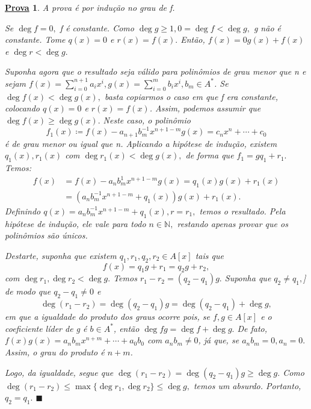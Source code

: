 \documentclass{article}
\newtheorem*{proof*}{\underline{Prova}}
\renewcommand\qedsymbol{$\blacksquare$}
\begin{document}
    \begin{proof*}
      A prova é por indução no grau de f.

      Se \(\deg{f}=0,\) f é constante. Como \(\deg{g}\geq 1, 0 = \deg{f} < \deg{g},\) g não é constante.
      Tome \(q(x) = 0\) e \(r(x) = f(x).\) Então, \(f(x) = 0g(x) + f(x)\) e \(\deg{r} < \deg{g}.\)

      Suponha agora que o resultado seja válido para polinômios de grau menor que n e sejam \(f(x) = \sum\limits_{i=0}^{n+1}a_{i}x^{i}, g(x) = \sum\limits_{i=0}^{m}b_{i}x^{i}, b_{m}\in A^{*}\).
      Se \(\deg{f(x)} < \deg{g(x)},\) basta copiarmos o caso em que f era constante, colocando \(q(x) = 0\) e \(r(x) = f(x)\).
      Assim, podemos assumir que \(\deg{f(x)}\geq \deg{g(x)}.\) Neste caso, o polinômio 
      \[
        f_{1}(x)\coloneqq f(x) - a_{n+1}b_{m}^{-1}x^{n+1-m}g(x) = c_{n}x^{n} + \cdots + c_{0}
      \] 
      é de grau menor ou igual que n. Aplicando a hipótese de indução, existem \(q_{1}(x), r_{1}(x)\) 
      com \(\deg{r_{1}(x)} < \deg{g(x)},\) de forma que \(f_{1} = gq_{1} + r_{1}.\) Temos:
      \begin{align*}
        f(x) &= f(x)-a_{n}b_{m}^{1}x^{n+1-m}g(x) = q_{1}(x)g(x) + r_{1}(x)\\
             &= (a_{n}b_{m}^{-1}x^{n+1-m}+q_{1}(x))g(x) + r_{1}(x).
      \end{align*}
      Definindo \(q(x) = a_{n}b_{m}^{-1}x^{n+1-m}+q_{1}(x), r = r_{1},\) temos o resultado. Pela hipótese
      de indução, ele vale para todo \(n\in \mathbb{N},\) restando apenas provar que os polinômios são únicos.

      Destarte, suponha que existem \(q_{1}, r_{1}, q_{2}, r_{2}\in A[x]\) tais que 
      \[
        f(x) = q_{1}g+r_{1} = q_{2}g+r_{2},
      \]
      com \(\deg{r_{1}}, \deg{r_{2}} < \deg{g}.\) Temos \(r_{1}-r_{2} = (q_{2}-q_{1})g.\) Suponha que \(q_{2}\neq q_{1},\)]
      de modo que \(q_{2}-q_{1}\neq0\) e 
      \[
        \deg{(r_{1}-r_{2})} = \deg{(q_{2}-q_{1})}g = \deg{(q_{2}-q_{1})} + \deg{g},
      \]
      em que a igualdade do produto dos graus ocorre pois, se \(f, g\in A[x]\) e o coeficiente líder de g é \(b\in A^{*}\),
      então \(\deg{fg} = \deg{f} + \deg{g}.\) De fato, \(f(x)g(x) = a_{n}b_{m}x^{n+m} + \cdots + a_{0}b_{0}\) com
      \(a_{n}b_{m}\neq0\), já que, se \(a_{n}b_{m} = 0, a_{n} = 0.\) Assim, o grau do produto é \(n+m\).

      Logo, da igualdade, segue que \(\deg{(r_{1}-r_{2})} = \deg{(q_{2}-q_{1})g}\geq \deg{g}.\) Como
      \(\deg{(r_{1}-r_{2})}\leq \max\{\deg{r_{1}}, \deg{r_{2}}\}\leq \deg{g},\) temos um absurdo. Portanto,
      \(q_{2} = q_{1}.\) \qedsymbol
    \end{proof*}
\end{document}
